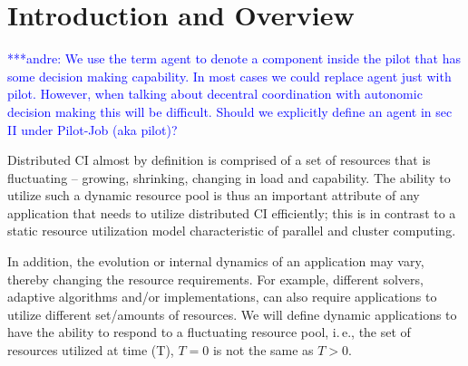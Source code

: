 \documentclass[conference,final]{IEEEtran}
\newcommand{\jhanote}[1]{ {\textcolor{red} { ***shantenu: #1 }}}
\newcommand{\alnote}[1]{ {\textcolor{blue} { ***andre: #1 }}}
\newcommand{\alnote}[1]{}
\newcommand{\jhanote}[1]{}
\newcommand{\upp}{\vspace*{-0.5em}}
\begin{document}




\section{Introduction and Overview \upp\upp}

\alnote{We use the term agent to denote a component inside the pilot
  that has some decision making capability. In most cases we could
  replace agent just with pilot. However, when talking about decentral
  coordination with autonomic decision making this will be
  difficult. Should we explicitly define an agent in sec II under
  Pilot-Job (aka pilot)?}
 
Distributed CI almost by definition is comprised of a set of resources
that is fluctuating -- growing, shrinking, changing in load and
capability.  The ability to utilize such a dynamic resource pool is
thus an important attribute of any application that needs to utilize
distributed CI efficiently; this is in contrast to a static resource
utilization model characteristic of parallel and cluster computing.

In addition, the evolution or internal dynamics of an application may
vary, thereby changing the resource requirements.
For example, different solvers, %
adaptive algorithms and/or implementations, can also require
applications to utilize different set/amounts of resources.
We will define dynamic applications to have the ability to respond to
a fluctuating resource pool, i.\,e., the set of resources utilized at
time (T), $T=0$ is not the same as $T>0$.
\end{document}
